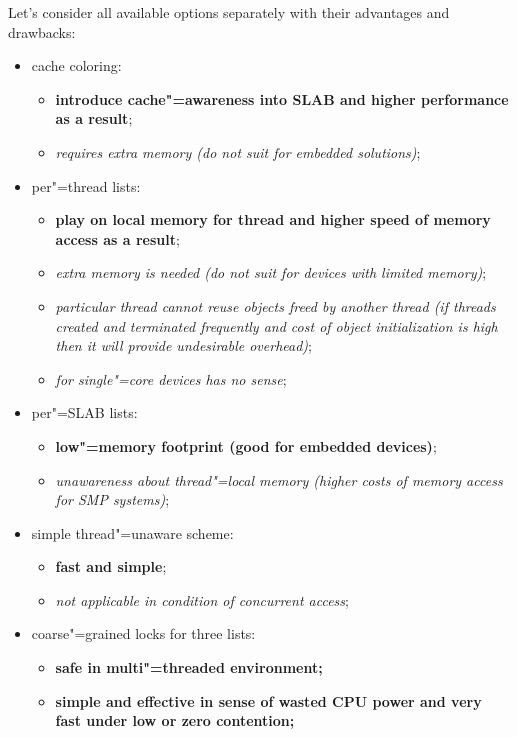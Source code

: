 \documentclass[10pt, a5paper]{article}
\begin{document}
Let's consider all available options separately with their advantages and drawbacks:

\begin{itemize}
  \item cache coloring:\begin{itemize}
  \item \textbf{introduce cache"=awareness into SLAB and higher \linebreak performance as a result};
  \item \emph{requires extra memory (do not suit for embedded solutions)};
\end{itemize}
  \item per"=thread lists:\begin{itemize}
  \item \textbf{play on local memory for thread and higher speed of memory access as a result};
  \item \emph{extra memory is needed (do not suit for devices with limited memory)};
  \item \emph{particular thread cannot reuse objects freed by another thread (if threads created and terminated frequently and cost of object initialization is high then it will provide undesirable overhead)};
  \item \emph{for single"=core devices has no sense};
\end{itemize}
  \item per"=SLAB lists:\begin{itemize}
  \item \textbf{low"=memory footprint (good for embedded devices)};
  \item \emph{unawareness about thread"=local memory (higher costs of \linebreak memory access for SMP systems)};
\end{itemize}
 \item simple thread"=unaware scheme:\begin{itemize}
  \item \textbf{fast and simple};
  \item \emph{not applicable in condition of concurrent access};
\end{itemize}
  \item coarse"=grained locks for three lists:\begin{itemize}
  \item \textbf{safe in multi"=threaded environment;}
  \item \textbf{simple and effective in sense of wasted CPU power and very fast under low or zero contention;}

\end{itemize}
\end{itemize}
\end{document}
